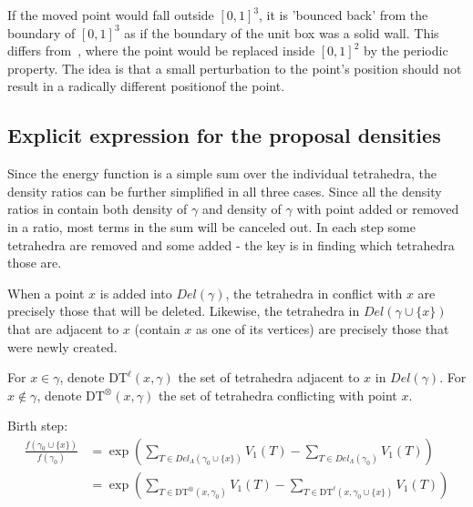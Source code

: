 \documentclass[12pt,a4paper]{report}
\begin{document}

If the moved point would fall outside $[0,1]^3$, it is  'bounced back' from the boundary of $[0,1]^3$ as if the boundary of the unit box was a solid wall. 
This differs from~\cite{DL10}, where the point would be replaced inside $[0,1]^2$ by the periodic property. 
The idea is that a small perturbation to the point's position should not result in a radically different positionof the point. 


\subsection{Explicit expression for the proposal densities}

Since the energy function is a simple sum over the individual tetrahedra, the density ratios can be further simplified in all three cases. Since all the density ratios in contain both density of $\gamma$ and density of $\gamma$ with point added or removed in a ratio, most terms in the sum will be canceled out. In each step some tetrahedra are removed and some added - the key is in finding which tetrahedra those are. 

When a point $x$ is added into $Del(\gamma)$, the tetrahedra in conflict with $x$ are precisely those that will be deleted. Likewise, the tetrahedra in $Del(\gamma\cup\{x\})$ that are adjacent to $x$ (contain $x$ as one of its vertices) are precisely those that were newly created.

For $x\in \gamma$, denote $\text{DT}^\ell(x,\gamma)$ the set of tetrahedra adjacent to $x$ in $Del(\gamma)$. For $x \notin \gamma$, denote $\text{DT}^\otimes (x,\gamma)$ the set of tetrahedra conflicting with point $x$. 

Birth step:
\begin{align*}
\frac{f(\gamma_0 \cup \{x\})}{f(\gamma_0)} &= \exp\left({\sum_{T\in Del_\Lambda(\gamma_0 \cup \{x\})} V_1(T) - \sum_{T \in Del_\Lambda(\gamma_0)}V_1(T)}\right) \\
&= \exp\left(  \sum_{T \in \text{DT}^\otimes (x,\gamma_0)} V_1(T)  - \sum_{T\in \text{DT}^\ell (x,\gamma_0\cup\{x\})} V_1(T) \right)  
\end{align*}
\end{document}
